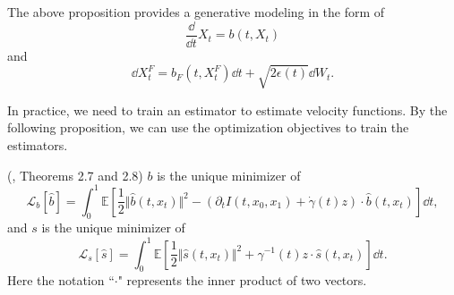 
The above proposition provides a generative modeling in the form of 
$$\frac{\dd}{\dd t}X_t=b(t,X_t)$$
and
$$\dd X_t^F=b_F(t,X_t^F)\dd t+\sqrt{2\epsilon(t)}\dd W_t.$$

In practice, we need to train an estimator to estimate velocity functions. By the following proposition, we can use the optimization objectives to train the estimators. 

\begin{proposition}
    (\cite{interpolation}, Theorems 2.7 and 2.8)
    $b$ is the unique minimizer of
    $$\mathcal{L}_b[\hat{b}]=\int_0^1\mathbb{E}\left[\frac{1}{2}\Vert\hat{b}(t,x_t)\Vert^2-(\partial_tI(t,x_0,x_1)+\dot{\gamma}(t)z)\cdot\hat{b}(t,x_t)\right]\dd t,$$
    and $s$ is the unique minimizer of
    $$\mathcal{L}_s[\hat{s}]=\int_0^1\mathbb{E}\left[\frac{1}{2}\Vert\hat{s}(t,x_t)\Vert^2+\gamma^{-1}(t)z\cdot\hat{s}(t,x_t)\right]\dd t.$$
    Here the notation ``$\cdot$" represents the inner product of two vectors.
    \label{prop:objectives}
\end{proposition}
